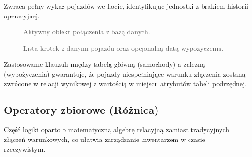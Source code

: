 \documentclass[a4paper,11pt,english,openany,oneside]{sphinxmanual}
\begin{document}
\begin{savenotes}\begin{fulllineitems}

\pysigstartsignatures
\pysiglinewithargsret
{}
{}
{}
\pysigstopsignatures
\sphinxAtStartPar
Zwraca pełny wykaz pojazdów we flocie, identyfikując jednostki z brakiem historii operacyjnej.
\begin{quote}\begin{description}
\sphinxAtStartPar
{} \textendash{} Aktywny obiekt połączenia z bazą danych.

\sphinxAtStartPar
Lista krotek z danymi pojazdu oraz opcjonalną datą wypożyczenia.

\end{description}\end{quote}

\sphinxAtStartPar
{} Zastosowanie klauzuli  między tabelą główną (samochody) a zależną (wypożyczenia) gwarantuje, że pojazdy niespełniające warunku złączenia zostaną zwrócone w relacji wynikowej z wartością  w miejscu atrybutów tabeli podrzędnej.

\end{fulllineitems}\end{savenotes}



\subsection{Operatory zbiorowe (Różnica)}
\label{\detokenize{rozdzial_5/index:operatory-zbiorowe-roznica}}
\sphinxAtStartPar
Część logiki oparto o matematyczną algebrę relacyjną zamiast tradycyjnych złączeń warunkowych, co ułatwia zarządzanie inwentarzem w czasie rzeczywistym.
\end{document}
